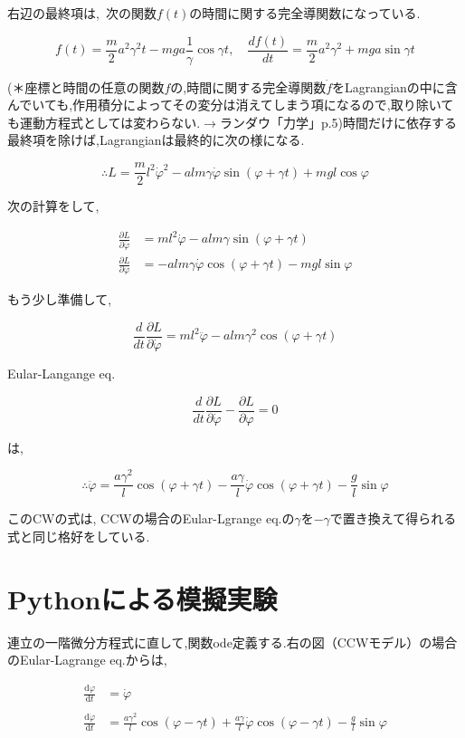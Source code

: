 右辺の最終項は, 次の関数$f(t)$の時間に関する完全導関数になっている.

\[f(t)=\displaystyle\frac{m}{2}a^2\gamma^2t - mga\frac{1}{\gamma}\cos\gamma t,\quad\frac{df(t)}{dt}=\frac{m}{2}a^2\gamma^2+mga\sin\gamma t\]

(＊座標と時間の任意の関数$f$の,時間に関する完全導関数$\dot{f}$をLagrangianの中に含んでいても,作用積分によってその変分は消えてしまう項になるので,取り除いても運動方程式としては変わらない.$\rightarrow$ランダウ「力学」p.5)時間だけに依存する最終項を除けば,Lagrangianは最終的に次の様になる.

\[\therefore L=\displaystyle\frac{m}{2}l^2\dot{\varphi}^2 - alm\gamma\dot{\varphi}\sin(\varphi+\gamma t)+mgl\cos\varphi\]

次の計算をして,

\begin{align*}
   \displaystyle\frac{\partial L}{\partial\dot{\varphi}}&=ml^2\dot{\varphi} - alm\gamma\sin(\varphi+\gamma t)\\
   \displaystyle\frac{\partial L}{\partial\varphi}&=-alm\gamma\dot{\varphi}\cos(\varphi+\gamma t)- mgl\sin\varphi
\end{align*}

もう少し準備して,

\[\displaystyle\frac{d}{dt}\frac{\partial L}{\partial\dot{\varphi}}=ml^2\ddot{\varphi}-alm\gamma^2\cos(\varphi+\gamma t)\]

Eular-Langange eq.

\[\displaystyle\frac{d}{dt}\frac{\partial L}{\partial\dot{\varphi}}-\frac{\partial L}{\partial\varphi}=0\]

は,

\[\therefore \ddot{\varphi}=\displaystyle\frac{a\gamma^2}{l}\cos(\varphi+\gamma t)-\frac{a\gamma}{l}\dot{\varphi}\cos(\varphi+\gamma t)-\frac{g}{l}\sin\varphi\]

このCWの式は, CCWの場合のEular-Lgrange eq.の$\gamma$を$-\gamma$で置き換えて得られる式と同じ格好をしている.

\section{Pythonによる模擬実験}

連立の一階微分方程式に直して,関数ode定義する.右の図（CCWモデル）の場合のEular-Lagrange eq.からは,

\begin{align*}
   \displaystyle\frac{\mathrm{d}\varphi}{\mathrm{d}t}&=\dot{\varphi}\\\\
   \displaystyle\frac{\mathrm{d}\dot{\varphi}}{\mathrm{d}t}&=\displaystyle\frac{a\gamma^2}{l}\cos(\varphi-\gamma t) +\frac{a\gamma}{l}\dot{\varphi}\cos(\varphi-\gamma t)- \frac{g}{l}\sin\varphi
\end{align*}\\

